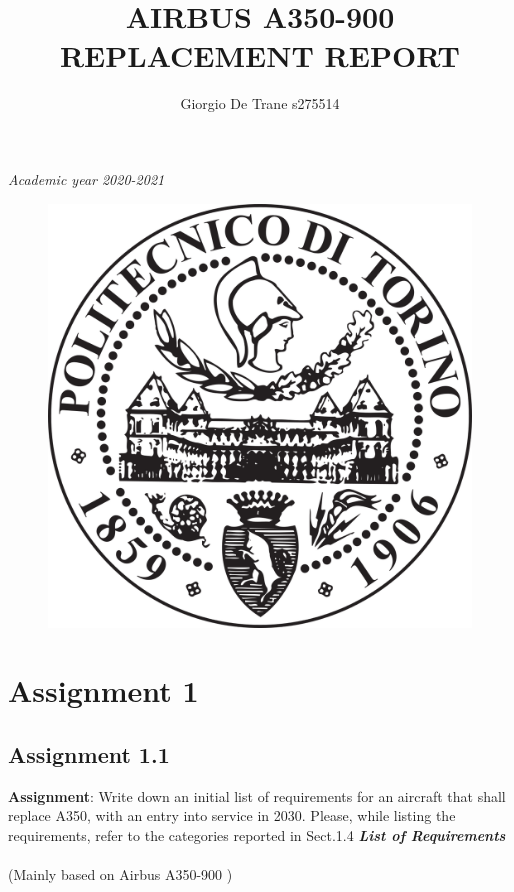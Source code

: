 \documentclass{article}
\author{Giorgio De Trane s275514}
\title{\textbf{AIRBUS A350-900 REPLACEMENT REPORT}}
\begin{document}
\setlength{\parindent}{0pt}
\maketitle
\begin{center}
    \textit{Academic year 2020-2021}
\end{center}
\begin{figure}[h!]
    \centering
    \includegraphics[width=\textwidth]{Sources/Plots_and_Pictures/polito_logo.png}\\
\end{figure}
\pagebreak
\tableofcontents
\pagebreak
\section{Assignment 1\label{Assignment_1}}
\subsection{Assignment 1.1\label{Assignment_1.1}}

\textbf{Assignment}: Write down an initial list of requirements for an
aircraft that shall replace A350, with an entry into service in 2030.
Please, while listing the requirements, refer to the categories
reported in Sect.1.4
\newline
\newline
\textbf{\textit{List of Requirements}}\\\\ (Mainly based on Airbus A350-900 \autocite{Airbus_A350-900})
\\ 
\end{document}
